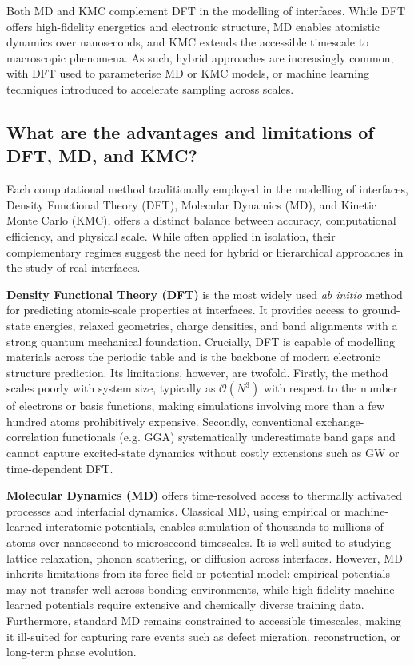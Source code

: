 Both MD and KMC complement DFT in the modelling of interfaces. While DFT offers high-fidelity energetics and electronic structure, MD enables atomistic dynamics over nanoseconds, and KMC extends the accessible timescale to macroscopic phenomena. As such, hybrid approaches are increasingly common, with DFT used to parameterise MD or KMC models, or machine learning techniques introduced to accelerate sampling across scales.

\subsection{What are the advantages and limitations of DFT, MD, and KMC?}

Each computational method traditionally employed in the modelling of interfaces, Density Functional Theory (DFT), Molecular Dynamics (MD), and Kinetic Monte Carlo (KMC), offers a distinct balance between accuracy, computational efficiency, and physical scale. While often applied in isolation, their complementary regimes suggest the need for hybrid or hierarchical approaches in the study of real interfaces.

\textbf{Density Functional Theory (DFT)} is the most widely used \textit{ab initio} method for predicting atomic-scale properties at interfaces. It provides access to ground-state energies, relaxed geometries, charge densities, and band alignments with a strong quantum mechanical foundation. Crucially, DFT is capable of modelling materials across the periodic table and is the backbone of modern electronic structure prediction. Its limitations, however, are twofold. Firstly, the method scales poorly with system size, typically as $\mathcal{O}(N^3)$ with respect to the number of electrons or basis functions, making simulations involving more than a few hundred atoms prohibitively expensive. Secondly, conventional exchange-correlation functionals (e.g. GGA) systematically underestimate band gaps and cannot capture excited-state dynamics without costly extensions such as GW or time-dependent DFT.

\textbf{Molecular Dynamics (MD)} offers time-resolved access to thermally activated processes and interfacial dynamics. Classical MD, using empirical or machine-learned interatomic potentials, enables simulation of thousands to millions of atoms over nanosecond to microsecond timescales. It is well-suited to studying lattice relaxation, phonon scattering, or diffusion across interfaces. However, MD inherits limitations from its force field or potential model: empirical potentials may not transfer well across bonding environments, while high-fidelity machine-learned potentials require extensive and chemically diverse training data. Furthermore, standard MD remains constrained to accessible timescales, making it ill-suited for capturing rare events such as defect migration, reconstruction, or long-term phase evolution.

